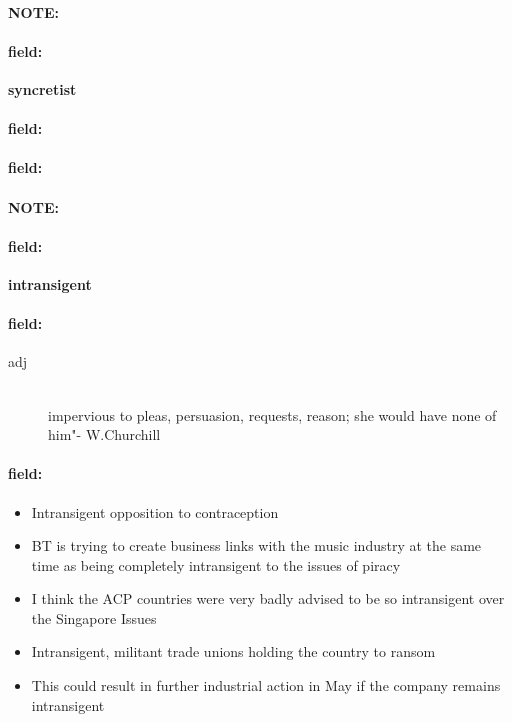 \documentclass[12pt]{article}
\newenvironment{note}{\paragraph{NOTE:}}{}
\newenvironment{field}{\paragraph{field:}}{}
\begin{document}
\begin{note}
\begin{field}
\textbf{\large syncretist}
\end{field}


\begin{field}
\end{field}

\begin{field}
\end{field}
\end{note}
\begin{note}
\begin{field}
\textbf{\large intransigent}
\end{field}


\begin{field}
\begin{description}
\item[adj] \hfill \\ 
impervious to pleas, persuasion, requests, reason; she would have none of him"- W.Churchill

\end{description}
\end{field}

\begin{field}
\begin{itemize}
\item Intransigent opposition to contraception
\item BT is trying to create business links with the music industry at the same time as being completely intransigent to the issues of piracy
\item I think the ACP countries were very badly advised to be so intransigent over the Singapore Issues
\item Intransigent, militant trade unions holding the country to ransom
\item This could result in further industrial action in May if the company remains intransigent
\end{itemize}
\end{field}
\end{note}
\end{document}
